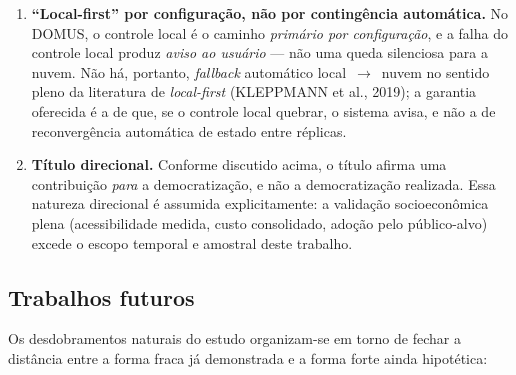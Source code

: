 \begin{enumerate}
  \item \textbf{``Local-first'' por configuração, não por contingência automática.} No
  DOMUS, o controle local é o caminho \emph{primário por configuração}, e a falha do
  controle local produz \emph{aviso ao usuário} --- não uma queda silenciosa para a
  nuvem. Não há, portanto, \textit{fallback} automático local~$\rightarrow$~nuvem no
  sentido pleno da literatura de \textit{local-first} (KLEPPMANN et al., 2019); a
  garantia oferecida é a de que, se o controle local quebrar, o sistema avisa, e não a
  de reconvergência automática de estado entre réplicas.

  \item \textbf{Título direcional.} Conforme discutido acima, o título afirma uma
  contribuição \emph{para} a democratização, e não a democratização realizada. Essa
  natureza direcional é assumida explicitamente: a validação socioeconômica plena
  (acessibilidade medida, custo consolidado, adoção pelo público-alvo) excede o escopo
  temporal e amostral deste trabalho.
\end{enumerate}

\subsection{Trabalhos futuros}\label{sec:futuros}

Os desdobramentos naturais do estudo organizam-se em torno de fechar a distância entre a
forma fraca já demonstrada e a forma forte ainda hipotética:

